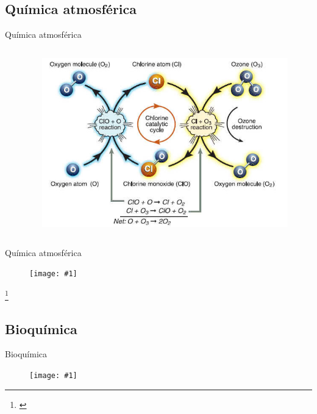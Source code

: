\documentclass[handout]{beamer}
\newcommand\blfootnote[1]
{%
	\begingroup
	\renewcommand\thefootnote{}\footnote{#1}%
	\addtocounter{footnote}{-1}%
	\endgroup
}
\newcommand{\fcite}[1]{\blfootnote{\cite{#1}}}
\newcommand{\cfigure}[2]
{
	\begin{figure}
		\centering
		\texttt{[image: \#1]}
	\end{figure}
}
\begin{document}
\subsection{Química atmosférica}
\begin{frame}{Qu\'imica atmosf\'erica}
	\begin{columns}
		\begin{column}{0.5\textwidth}
		\end{column}
		\begin{column}{0.5\linewidth}
			\begin{figure}[h]
				\centering
				\includegraphics[scale = 0.125]{sources/ozone.jpg}
			\end{figure}
		\end{column}
	\end{columns}
\end{frame}

\begin{frame}{Qu\'imica atmosf\'erica}
	\cfigure{sources/stratospheric_chlorine.png}{0.7\linewidth}
	\fcite{ravishankara2009nitrous}
\end{frame}

\subsection{Bioqu\'imica}
\begin{frame}{Bioqu\'imica}
	\begin{figure}[h]
		\centering
	\end{figure}
	\cfigure{sources/enzymeCycle.png}{0.7\linewidth}
\end{frame}
\end{document}
